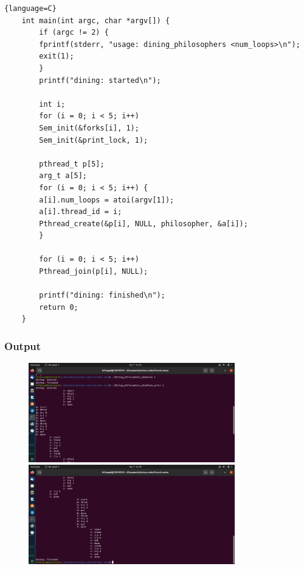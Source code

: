 \documentclass[11pt,a4paper]{article}
\begin{document}
\begin{lstlisting}{language=C}
	int main(int argc, char *argv[]) {
		if (argc != 2) {
		fprintf(stderr, "usage: dining_philosophers <num_loops>\n");
		exit(1);
		}
		printf("dining: started\n");
		
		int i;
		for (i = 0; i < 5; i++) 
		Sem_init(&forks[i], 1);
		Sem_init(&print_lock, 1);
	
		pthread_t p[5];
		arg_t a[5];
		for (i = 0; i < 5; i++) {
		a[i].num_loops = atoi(argv[1]);
		a[i].thread_id = i;
		Pthread_create(&p[i], NULL, philosopher, &a[i]);
		}
	
		for (i = 0; i < 5; i++) 
		Pthread_join(p[i], NULL); 
	
		printf("dining: finished\n");
		return 0;
	}
\end{lstlisting}

\subsubsection{Output}
\begin{figure}[h]
	\centering
	\includegraphics[width=0.8\textwidth]{Figure1/dining_deadlock1.png}
	\includegraphics[width=0.8\textwidth]{Figure1/dining_deadlock2.png}
\end{figure}
\end{document}
